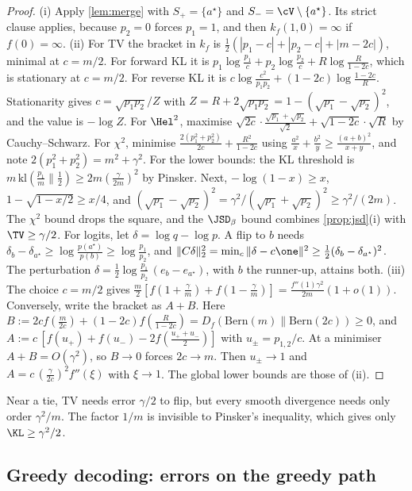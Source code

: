 \begin{proof}
(i) Apply \cref{lem:merge} with $S_+=\{a^\star\}$ and $S_-=\cV\setminus\{a^\star\}$. Its strict clause applies,
because $p_2=0$ forces $p_1=1$, and then $k_f(1,0)=\infty$ if $f(0)=\infty$.
(ii) For TV the bracket in $k_f$ is $\frac12(|p_1-c|+|p_2-c|+|m-2c|)$, minimal at $c=m/2$. For forward KL it
is $p_1\log\frac{p_1}c+p_2\log\frac{p_2}c+R\log\frac R{1-2c}$, which is stationary at $c=m/2$. For reverse KL it is
$c\log\frac{c^2}{p_1p_2}+(1-2c)\log\frac{1-2c}R$. Stationarity gives $c=\sqrt{p_1p_2}/Z$ with
$Z=R+2\sqrt{p_1p_2}=1-(\sqrt{p_1}-\sqrt{p_2})^2$, and the value is $-\log Z$. For $\Hel^2$, maximise
$\sqrt{2c}\cdot\frac{\sqrt{p_1}+\sqrt{p_2}}{\sqrt2}+\sqrt{1-2c}\cdot\sqrt R$ by Cauchy--Schwarz. For $\chi^2$, minimise
$\frac{2(p_1^2+p_2^2)}{2c}+\frac{R^2}{1-2c}$ using $\frac{a^2}x+\frac{b^2}y\ge\frac{(a+b)^2}{x+y}$, and note
$2(p_1^2+p_2^2)=m^2+\gamma^2$. For the lower bounds: the KL threshold is $m\,\mathrm{kl}(\frac{p_1}m\|\frac12)\ge2m(\frac\gamma{2m})^2$
by Pinsker. Next, $-\log(1-x)\ge x$, $1-\sqrt{1-x/2}\ge x/4$, and
$(\sqrt{p_1}-\sqrt{p_2})^2=\gamma^2/(\sqrt{p_1}+\sqrt{p_2})^2\ge\gamma^2/(2m)$. The $\chi^2$ bound drops the square,
and the $\JSD_\beta$ bound combines \cref{prop:jsd}(i) with $\TV\ge\gamma/2$. For logits, let
$\delta=\log q-\log p$. A flip to $b$ needs $\delta_b-\delta_{a^\star}\ge\log\frac{p(a^\star)}{p(b)}\ge\log\frac{p_1}{p_2}$, and
$\|C\delta\|_2^2=\min_c\|\delta-c\one\|^2\ge\frac12(\delta_b-\delta_{a^\star})^2$. The perturbation
$\delta=\frac12\log\frac{p_1}{p_2}\,(e_{b}-e_{a^\star})$, with $b$ the runner-up, attains both.
(iii) The choice $c=m/2$ gives $\frac m2[f(1+\frac\gamma m)+f(1-\frac\gamma m)]=\frac{f''(1)\gamma^2}{2m}(1+o(1))$.
Conversely, write the bracket as $A+B$. Here $B:=2cf(\frac m{2c})+(1-2c)f(\frac R{1-2c})=D_f(\mathrm{Bern}(m)\|\mathrm{Bern}(2c))\ge0$,
and $A:=c\,[f(u_+)+f(u_-)-2f(\frac{u_++u_-}2)]$ with $u_\pm=p_{1,2}/c$. At a minimiser $A+B=O(\gamma^2)$, so
$B\to0$ forces $2c\to m$. Then $u_\pm\to1$ and $A=c\,(\frac{\gamma}{2c})^2f''(\xi)$ with $\xi\to1$. The global
lower bounds are those of (ii).
\end{proof}

\noindent
Near a tie, TV needs error $\gamma/2$ to flip, but every smooth divergence needs only order $\gamma^2/m$. The
factor $1/m$ is invisible to Pinsker's inequality, which gives only $\KL\ge\gamma^2/2$.

\subsection{Greedy decoding: errors on the greedy path}


